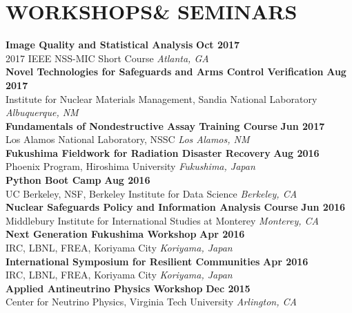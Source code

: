 \section{\small{WORKSHOPS\newline \& SEMINARS}}

{\bf Image Quality and Statistical Analysis} \hfill {\bf Oct 2017}\\
{\small{2017 IEEE NSS-MIC Short Course}} \hfill {\sl Atlanta, GA}\\[-3.5ex]

{\bf Novel Technologies for Safeguards and Arms Control Verification} \hfill {\bf Aug 2017}\\
{\small{Institute for Nuclear Materials Management, Sandia National Laboratory}} \hfill {\sl Albuquerque, NM}\\[-3.5ex]

{\bf Fundamentals of Nondestructive Assay Training Course} \hfill {\bf Jun 2017}\\
{\small{Los Alamos National Laboratory, NSSC}} \hfill {\sl Los Alamos, NM}\\[-3.5ex]

{\bf Fukushima Fieldwork for Radiation Disaster Recovery} \hfill {\bf Aug 2016}\\
{\small{Phoenix Program, Hiroshima University}} \hfill {\sl Fukushima, Japan}\\[-3.5ex]

{\bf Python Boot Camp} \hfill {\bf Aug 2016}\\
{\small{UC Berkeley, NSF, Berkeley Institute for Data Science}} \hfill {\sl Berkeley, CA}\\[-3.5ex]

{\bf Nuclear Safeguards Policy and Information Analysis Course} \hfill {\bf Jun 2016}\\
{\small{Middlebury Institute for International Studies at Monterey}} \hfill {\sl Monterey, CA}\\[-3.5ex]

{\bf Next Generation Fukushima Workshop} \hfill {\bf Apr 2016}\\
{\small{IRC, LBNL, FREA, Koriyama City}} \hfill {\sl Koriyama, Japan}\\[-3.5ex]

{\bf International Symposium for Resilient Communities} \hfill {\bf Apr 2016}\\
{\small{IRC, LBNL, FREA, Koriyama City}} \hfill {\sl Koriyama, Japan}\\[-3.5ex]

{\bf Applied Antineutrino Physics Workshop} \hfill {\bf Dec 2015}\\
{\small{Center for Neutrino Physics, Virginia Tech University}} \hfill {\sl Arlington, CA}\\[-3.5ex]


